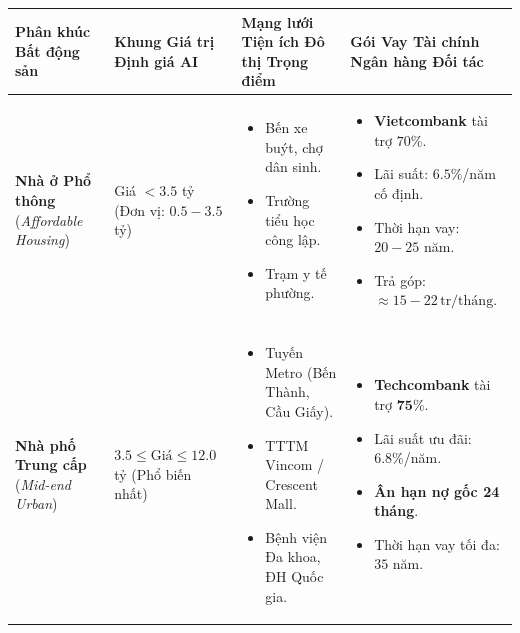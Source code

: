 \documentclass[12pt,a4paper]{report}
\begin{document}
\begin{table}[H]
\centering
\small
\begin{tabularx}{\textwidth}{p{3.2cm}p{3.0cm}Xp{4.2cm}}
\toprule
\textbf{Phân khúc Bất động sản} & \textbf{Khung Giá trị Định giá AI} & \textbf{Mạng lưới Tiện ích Đô thị Trọng điểm} & \textbf{Gói Vay Tài chính Ngân hàng Đối tác} \\
\midrule
\textbf{Nhà ở Phổ thông} \newline (\textit{Affordable Housing}) & Giá $< 3.5$ tỷ \newline (Đơn vị: $0.5 - 3.5$ tỷ) & 
\begin{itemize}[leftmargin=1.0em, topsep=0pt, partopsep=0pt, parsep=0pt, itemsep=1pt]
    \item Bến xe buýt, chợ dân sinh.
    \item Trường tiểu học công lập.
    \item Trạm y tế phường.
\end{itemize} & 
\begin{itemize}[leftmargin=1.0em, topsep=0pt, partopsep=0pt, parsep=0pt, itemsep=1pt]
    \item \textbf{Vietcombank} tài trợ $70\%$.
    \item Lãi suất: $6.5\%$/năm cố định.
    \item Thời hạn vay: $20 - 25$ năm.
    \item Trả góp: $\approx 15 - 22\,\text{tr/tháng}$.
\end{itemize} \\
\midrule
\textbf{Nhà phố Trung cấp} \newline (\textit{Mid-end Urban}) & $3.5 \le \text{Giá} \le 12.0$ tỷ \newline (Phổ biến nhất) & 
\begin{itemize}[leftmargin=1.0em, topsep=0pt, partopsep=0pt, parsep=0pt, itemsep=1pt]
    \item Tuyến Metro (Bến Thành, Cầu Giấy).
    \item TTTM Vincom / Crescent Mall.
    \item Bệnh viện Đa khoa, ĐH Quốc gia.
\end{itemize} & 
\begin{itemize}[leftmargin=1.0em, topsep=0pt, partopsep=0pt, parsep=0pt, itemsep=1pt]
    \item \textbf{Techcombank} tài trợ $\mathbf{75\%}$.
    \item Lãi suất ưu đãi: $\mathbf{6.8\%}$/năm.
    \item \textbf{Ân hạn nợ gốc 24 tháng}.
    \item Thời hạn vay tối đa: $35$ năm.

\end{itemize}
\end{tabularx}
\end{table}
\end{document}
